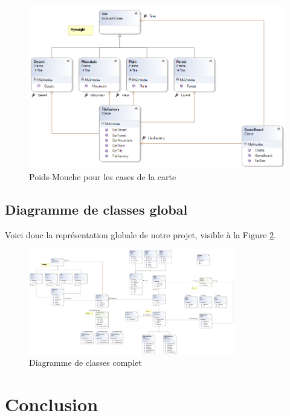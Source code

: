 \documentclass[a4paper]{article}
\begin{document}
\begin{figure}[ht]
\centering
	\includegraphics[width=\textwidth]{../Schemas/class_GameBoard_PoidsMouche.png}
		\caption{Poids-Mouche pour les cases de la carte}
		\label{fig:class_poidsmouche}
\end{figure}

\clearpage
	\subsection{Diagramme de classes global}
Voici donc la représentation globale de notre projet, visible à la Figure \ref{fig:class_global}.

\begin{figure}[ht]
\centering
	\includegraphics[width=0.8\textwidth, height=0.74\textheight]{../Schemas/class_global.png}
		\caption{Diagramme de classes complet}
		\label{fig:class_global}
\end{figure}

\clearpage
\section{Conclusion}
\newpage
\listoffigures
\end{document}
